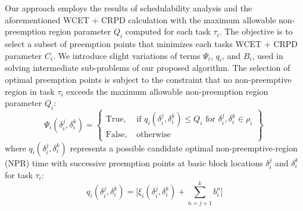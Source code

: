 Our approach employs the results of schedulability analysis and the aforementioned WCET + CRPD calculation with the maximum allowable non-preemption region parameter \begin{math}Q_{i}\end{math} computed for each task \begin{math}\tau_{i}\end{math}.  The objective is to select a subset of preemption points that minimizes each tasks WCET + CRPD parameter \begin{math}C_{i}\end{math}. We introduce slight variations of terms \begin{math}\Psi_{i}\end{math}, \begin{math}q_{i}\end{math}, and \begin{math}B_{i}\end{math}, used in solving intermediate sub-problems of our proposed algorithm.  The selection of optimal preemption points is subject to the constraint that no non-preemptive region in task \begin{math}\tau_{i}\end{math} exceeds the maximum allowable non-preemption region parameter \begin{math}Q_{i}\end{math}:
\begin{equation}\label{eqn:pp-constraint}
   \Psi_{i}(\delta_{i}^{j},\delta_{i}^{k}) =
\left\{
\begin{array}{lr}
    \textrm{True, }&\textrm{if } q_{i}(\delta_{i}^{j},\delta_{i}^{k}) \leq Q_{i} \textrm{ for } \delta_{i}^{j},\delta_{i}^{k} \in \rho_{i} \\
    \textrm{False, }&\textrm{otherwise}
\end{array}
\right\}~
\end{equation}
\newline
\noindent
where \begin{math}q_{i}(\delta_{i}^{j},\delta_{i}^{k})\end{math} represents a possible candidate optimal non-preemptive-region (NPR) time with successive preemption points at basic block locations \begin{math}\delta_{i}^{j}\end{math} and \begin{math}\delta_{i}^{k}\end{math} for task \begin{math}\tau_{i}\end{math}:
\begin{equation}\label{eqn:mthnpr-time}
   q_{i}(\delta_{i}^{j},\delta_{i}^{k}) = \Big[\xi_{i}(\delta_{i}^{j},\delta_{i}^{k}) + \sum_{n=j+1}^{k}b_{i}^{n}\Big]
\end{equation}

